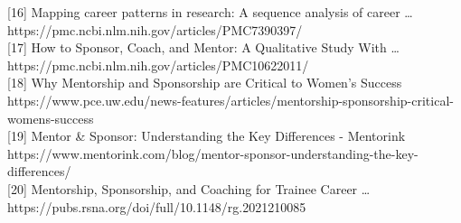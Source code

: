 \documentclass[
  letterpaper,
  DIV=11,
  numbers=noendperiod]{scrartcl}
\begin{document}
{[}16{]} Mapping career patterns in research: A sequence analysis of
career \ldots{} https://pmc.ncbi.nlm.nih.gov/articles/PMC7390397/\\
{[}17{]} How to Sponsor, Coach, and Mentor: A Qualitative Study With
\ldots{} https://pmc.ncbi.nlm.nih.gov/articles/PMC10622011/\\
{[}18{]} Why Mentorship and Sponsorship are Critical to Women's Success
https://www.pce.uw.edu/news-features/articles/mentorship-sponsorship-critical-womens-success\\
{[}19{]} Mentor \& Sponsor: Understanding the Key Differences -
Mentorink
https://www.mentorink.com/blog/mentor-sponsor-understanding-the-key-differences/\\
{[}20{]} Mentorship, Sponsorship, and Coaching for Trainee Career
\ldots{} https://pubs.rsna.org/doi/full/10.1148/rg.2021210085\\
\end{document}
